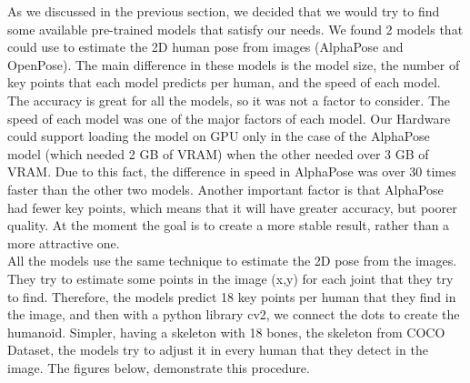 As we discussed in the previous section, we decided that we would try to find some available pre-trained models that satisfy our needs. We found 2 models that could use to estimate the 2D human pose from images (AlphaPose and OpenPose). The main difference in these models is the model size, the number of key points that each model predicts per human, and the speed of each model. The accuracy is great for all the models, so it was not a factor to consider. The speed of each model was one of the major factors of each model. Our Hardware could support loading the model on GPU only in the case of the AlphaPose model (which needed 2 GB of VRAM) when the other needed over 3 GB of VRAM. Due to this fact, the difference in speed in AlphaPose was over 30 times faster than the other two models. Another important factor is that AlphaPose had fewer key points, which means that it will have greater accuracy, but poorer quality. At the moment the goal is to create a more stable result, rather than a more attractive one.\\

All the models use the same technique to estimate the 2D pose from the images. They try to estimate some points in the image (x,y) for each joint that they try to find. Therefore, the models predict 18 key points per human that they find in the image, and then with a python library cv2, we connect the dots to create the humanoid. Simpler, having a skeleton with 18 bones, the skeleton from COCO Dataset, the models try to adjust it in every human that they detect in the image. The figures below, demonstrate this procedure.


